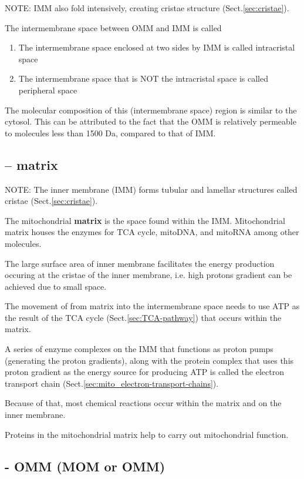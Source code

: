 NOTE: IMM also fold intensively, creating cristae structure
(Sect.\ref{sec:cristae}).

The intermembrane space between OMM and IMM is called
\begin{enumerate}
  \item The intermembrane space enclosed at two sides by IMM is called intracristal space

  \item	The intermembrane space that is NOT the intracristal space is called
		peripheral space
\end{enumerate}

The molecular composition of this (intermembrane space) region is similar to the
cytosol. This can be attributed to the fact that the OMM is relatively permeable
to molecules less than 1500 Da, compared to that of IMM.



\subsection{-- matrix}
\label{sec:mitochondria-matrix}

NOTE: The inner membrane (IMM) forms tubular and lamellar structures called
cristae (Sect.\ref{sec:cristae}).

The mitochondrial {\bf matrix} is the space found within the IMM.
Mitochondrial matrix houses the enzymes for TCA cycle, mitoDNA, and mitoRNA
among other molecules.

The large surface area of inner membrane facilitates the energy production
occuring at the cristae of the inner membrane, i.e. high protons gradient can be
achieved due to small space.

The movement of  from matrix into the intermembrane space needs to use
ATP as the result of the TCA cycle (Sect.\ref{sec:TCA-pathway}) that occurs
within the matrix.

A series of enzyme complexes on the IMM that functions as proton pumps
(generating the proton gradients), along with the protein complex that uses this
proton gradient as the energy source for producing ATP is called the electron
transport chain (Sect.\ref{sec:mito_electron-transport-chains}). 

Because of that, most chemical reactions occur within the matrix and on the
inner membrane. 

Proteins in the mitochondrial matrix help to carry out
mitochondrial function.


\subsection{- OMM (MOM or OMM)}
\label{sec:mito-OMM}
\label{sec:MOM-mito}

